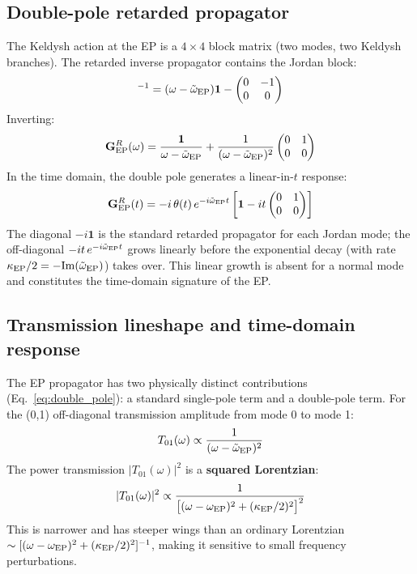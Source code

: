 \documentclass[12pt]{article}
\newcommand{\EP}{{\rm EP}}
\newcommand{\tomega}{\tilde{\omega}}
\begin{document}
\subsection{Double-pole retarded propagator}

The Keldysh action at the EP is a $4\times 4$ block matrix (two modes,
two Keldysh branches).  The retarded inverse propagator contains the
Jordan block:
\begin{equation}
  [\mathbf{G}_\EP^R(\omega)]^{-1} =
  (\omega-\tomega_\EP)\mathbf{1}
  -\begin{pmatrix}0 & -1\\0 & 0\end{pmatrix}
  \label{eq:jordan_inv}
\end{equation}
Inverting:
\begin{equation}
  \mathbf{G}_\EP^R(\omega) =
  \frac{\mathbf{1}}{\omega-\tomega_\EP}
  +\frac{1}{(\omega-\tomega_\EP)^2}
  \begin{pmatrix}0 & 1\\0 & 0\end{pmatrix}
  \label{eq:double_pole}
\end{equation}
In the time domain, the double pole generates a linear-in-$t$ response:
\begin{equation}
  \mathbf{G}_\EP^R(t) =
  -i\,\theta(t)\,e^{-i\tomega_\EP t}
  \left[\mathbf{1} - it\begin{pmatrix}0&1\\0&0\end{pmatrix}\right]
  \label{eq:ep_time}
\end{equation}
The diagonal $-i\mathbf{1}$ is the standard retarded propagator for each Jordan mode;
the off-diagonal $-it\,e^{-i\tomega_\EP t}$ grows linearly before the exponential
decay (with rate $\kappa_\EP/2 = -\mathrm{Im}(\tomega_\EP)$) takes over.
This linear growth is absent for a normal mode and constitutes the
time-domain signature of the EP.

\subsection{Transmission lineshape and time-domain response}

The EP propagator has two physically distinct contributions
(Eq.~\ref{eq:double_pole}): a standard single-pole term and a double-pole term.
For the (0,1) off-diagonal transmission amplitude from mode 0 to mode 1:
\begin{equation}
  T_{01}(\omega) \propto \frac{1}{(\omega-\tomega_\EP)^2}
\end{equation}
The power transmission $|T_{01}(\omega)|^2$ is a \textbf{squared Lorentzian}:
\begin{equation}
  |T_{01}(\omega)|^2 \propto
  \frac{1}{\bigl[(\omega-\omega_\EP)^2+(\kappa_\EP/2)^2\bigr]^2}
  \label{eq:ep_squared_lor}
\end{equation}
This is narrower and has steeper wings than an ordinary Lorentzian
$\sim[(\omega-\omega_\EP)^2+(\kappa_\EP/2)^2]^{-1}$,
making it sensitive to small frequency perturbations.
\end{document}
